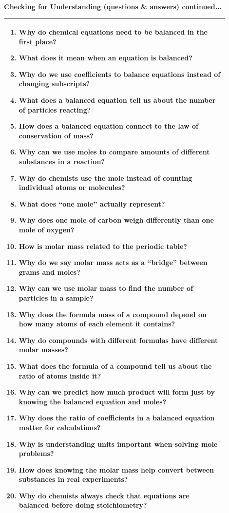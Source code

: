 \documentclass{article}
\begin{document}
\newpage
\noindent
{\large\textbf{Checking for Understanding (questions \& answers) continued...} \\
\vspace{0.2cm}
\begin{tabular}{|p{0.9\linewidth}|}
\hline
\begin{enumerate}
\item Why do chemical equations need to be balanced in the first place?
\item What does it mean when an equation is balanced?
\item Why do we use coefficients to balance equations instead of changing subscripts?
\item What does a balanced equation tell us about the number of particles reacting?
\item How does a balanced equation connect to the law of conservation of mass?
\item Why can we use moles to compare amounts of different substances in a reaction?
\item Why do chemists use the mole instead of counting individual atoms or molecules?
\item What does “one mole” actually represent?
\item Why does one mole of carbon weigh differently than one mole of oxygen?
\item How is molar mass related to the periodic table?
\item Why do we say molar mass acts as a “bridge” between grams and moles?
\item Why can we use molar mass to find the number of particles in a sample?
\item Why does the formula mass of a compound depend on how many atoms of each element it contains?
\item Why do compounds with different formulas have different molar masses?
\item What does the formula of a compound tell us about the ratio of atoms inside it?
\item Why can we predict how much product will form just by knowing the balanced equation and moles?
\item Why does the ratio of coefficients in a balanced equation matter for calculations?
\item Why is understanding units important when solving mole problems?
\item How does knowing the molar mass help convert between substances in real experiments?
\item Why do chemists always check that equations are balanced before doing stoichiometry?
\end{enumerate} \\
\hline
\end{tabular}


}
\end{document}
